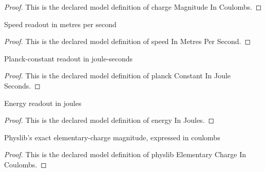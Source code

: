 \begin{proof}
  This is the declared model definition of charge Magnitude In Coulombs.
\end{proof}
\begin{definition}
  \label{def:physics:phyx-mini-0612:phyxminiproblems-problemphyxmini0612-speedinmetrespersecond}
  Speed readout in metres per second
\end{definition}
\begin{proof}
  This is the declared model definition of speed In Metres Per Second.
\end{proof}
\begin{definition}
  \label{def:physics:phyx-mini-0612:phyxminiproblems-problemphyxmini0612-planckconstantinjouleseconds}
  Planck-constant readout in joule-seconds
\end{definition}
\begin{proof}
  This is the declared model definition of planck Constant In Joule Seconds.
\end{proof}
\begin{definition}
  \label{def:physics:phyx-mini-0612:phyxminiproblems-problemphyxmini0612-energyinjoules}
  Energy readout in joules
\end{definition}
\begin{proof}
  This is the declared model definition of energy In Joules.
\end{proof}
\begin{definition}
  \label{def:physics:phyx-mini-0612:phyxminiproblems-problemphyxmini0612-physlibelementarychargeincoulombs}
  Physlib's exact elementary-charge magnitude, expressed in coulombs
\end{definition}
\begin{proof}
  This is the declared model definition of physlib Elementary Charge In Coulombs.
\end{proof}
